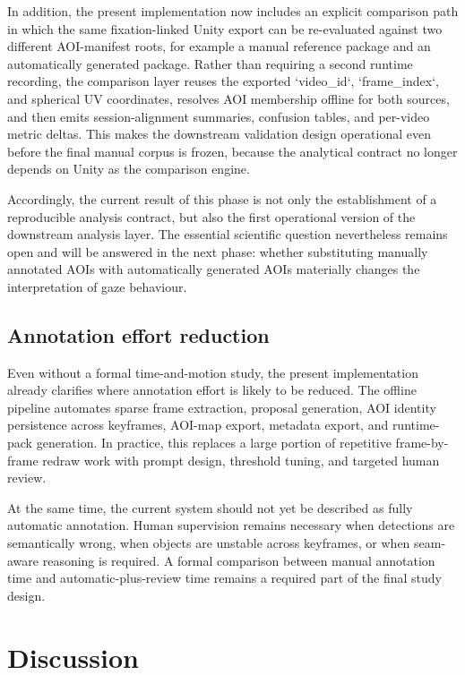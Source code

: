 \documentclass[11pt]{article}
\begin{document}
In addition, the present implementation now includes an explicit comparison path in which the same fixation-linked Unity export can be re-evaluated against two different AOI-manifest roots, for example a manual reference package and an automatically generated package. Rather than requiring a second runtime recording, the comparison layer reuses the exported `video\_id`, `frame\_index`, and spherical UV coordinates, resolves AOI membership offline for both sources, and then emits session-alignment summaries, confusion tables, and per-video metric deltas. This makes the downstream validation design operational even before the final manual corpus is frozen, because the analytical contract no longer depends on Unity as the comparison engine.

Accordingly, the current result of this phase is not only the establishment of a reproducible analysis contract, but also the first operational version of the downstream analysis layer. The essential scientific question nevertheless remains open and will be answered in the next phase: whether substituting manually annotated AOIs with automatically generated AOIs materially changes the interpretation of gaze behaviour.

\subsection{Annotation effort reduction}
Even without a formal time-and-motion study, the present implementation already clarifies where annotation effort is likely to be reduced. The offline pipeline automates sparse frame extraction, proposal generation, AOI identity persistence across keyframes, AOI-map export, metadata export, and runtime-pack generation. In practice, this replaces a large portion of repetitive frame-by-frame redraw work with prompt design, threshold tuning, and targeted human review.

At the same time, the current system should not yet be described as fully automatic annotation. Human supervision remains necessary when detections are semantically wrong, when objects are unstable across keyframes, or when seam-aware reasoning is required. A formal comparison between manual annotation time and automatic-plus-review time remains a required part of the final study design.

\section{Discussion}
\end{document}
